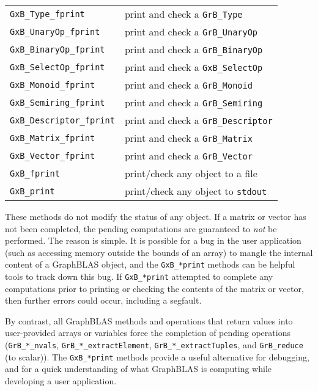 \documentclass[12pt]{article}
\begin{document}
\vspace{0.2in}
{\footnotesize
\begin{tabular}{ll}
\hline
\verb'GxB_Type_fprint'        & print and check a \verb'GrB_Type' \\
\verb'GxB_UnaryOp_fprint'     & print and check a \verb'GrB_UnaryOp' \\
\verb'GxB_BinaryOp_fprint'    & print and check a \verb'GrB_BinaryOp' \\
\verb'GxB_SelectOp_fprint'    & print and check a \verb'GxB_SelectOp' \\
\verb'GxB_Monoid_fprint'      & print and check a \verb'GrB_Monoid' \\
\verb'GxB_Semiring_fprint'    & print and check a \verb'GrB_Semiring' \\
\verb'GxB_Descriptor_fprint'  & print and check a \verb'GrB_Descriptor' \\
\verb'GxB_Matrix_fprint'      & print and check a \verb'GrB_Matrix' \\
\verb'GxB_Vector_fprint'      & print and check a \verb'GrB_Vector' \\
\hline
\verb'GxB_fprint'             & print/check any object to a file \\
\verb'GxB_print'              & print/check any object to \verb'stdout' \\
\hline
\end{tabular}
}
\vspace{0.2in}

These methods do not modify the status of any object.  If a matrix or vector
has not been completed, the pending computations are guaranteed to {\em not} be
performed. The reason is simple.  It is possible for a bug in the user
application (such as accessing memory outside the bounds of an array) to mangle
the internal content of a GraphBLAS object, and the \verb'GxB_*print' methods
can be helpful tools to track down this bug.  If \verb'GxB_*print' attempted to
complete any computations prior to printing or checking the contents of the
matrix or vector, then further errors could occur, including a segfault.

By contrast, all GraphBLAS methods and operations that return values into
user-provided arrays or variables force the completion of pending operations
(\verb'GrB_*_nvals', \verb'GrB_*_extractElement', \verb'GrB_*_extractTuples',
and \verb'GrB_reduce' (to scalar)).  The \verb'GxB_*print' methods provide
a useful alternative for debugging, and for a quick understanding of what
GraphBLAS is computing while developing a user application.
\end{document}
